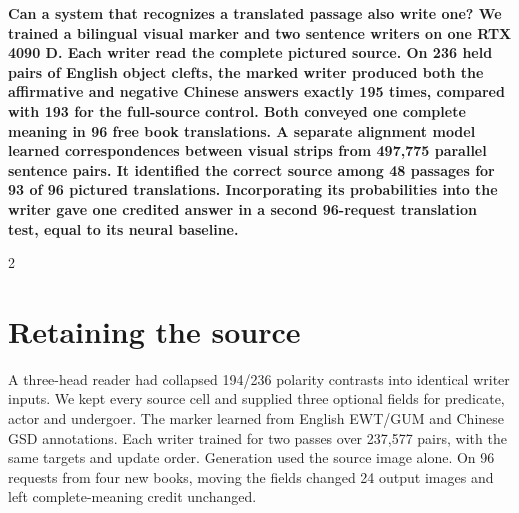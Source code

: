 \noindent\textbf{Can a system that recognizes a translated passage also write one? We trained a bilingual visual marker and two sentence writers on one RTX 4090 D. Each writer read the complete pictured source. On 236 held pairs of English object clefts, the marked writer produced both the affirmative and negative Chinese answers exactly 195 times, compared with 193 for the full-source control. Both conveyed one complete meaning in 96 free book translations. A separate alignment model learned correspondences between visual strips from 497,775 parallel sentence pairs. It identified the correct source among 48 passages for 93 of 96 pictured translations. Incorporating its probabilities into the writer gave one credited answer in a second 96-request translation test, equal to its neural baseline.}\par
\begin{multicols}{2}
\section*{Retaining the source}
A three-head reader had collapsed 194/236 polarity contrasts into identical writer inputs. We kept every source cell and supplied three optional fields for predicate, actor and undergoer. The marker learned from English EWT/GUM and Chinese GSD annotations. Each writer trained for two passes over 237,577 pairs, with the same targets and update order. Generation used the source image alone. On 96 requests from four new books, moving the fields changed 24 output images and left complete-meaning credit unchanged.
\end{multicols}
